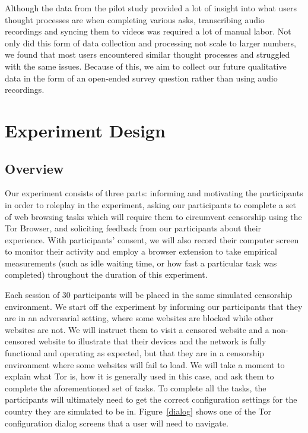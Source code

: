 \documentclass[letterpaper,twocolumn,11pt]{article}
\begin{document}
Although the data from the pilot study provided a lot of insight into what users thought processes
are when completing various asks, transcribing audio recordings and syncing them to videos was
required a lot of manual labor. Not only did this form of data collection and processing not scale 
to larger numbers, we found that most users encountered similar thought processes and struggled
with the same issues. Because of this, we aim to collect our future qualitative data in the form of 
an open-ended survey question rather than using audio recordings. 

\section{Experiment Design}

\subsection{Overview} 
Our experiment consists of three parts: informing and motivating the participants in order 
to roleplay in the experiment, asking our participants to complete a set of web browsing tasks which will 
require them to circumvent censorship using the Tor Browser, and soliciting feedback from our participants
about their experience. With participants' consent, we will also record their computer screen to monitor 
their activity and employ a browser extension to take empirical measurements (such as idle waiting time, 
or how fast a particular task was completed) throughout the duration of this experiment. 

Each session of 30 participants will be placed in the same simulated censorship environment. 
We start off the experiment by informing our participants that they are in an adversarial setting, 
where some websites are blocked while other websites are not. We will instruct them to visit a censored
website and a non-censored website to illustrate that their devices and the network is fully functional and
operating as expected, but that they are in a censorship environment where some websites will fail to load. 
We will take a moment to explain what Tor is, how it is generally used in this case, and ask them to complete 
the aforementioned set of tasks. To complete all the tasks, the participants will ultimately need to get the correct
configuration settings for the country they are simulated to be in.  Figure~\ref{dialog} shows one of the 
Tor configuration dialog screens that a user will need to navigate. 
\end{document}

